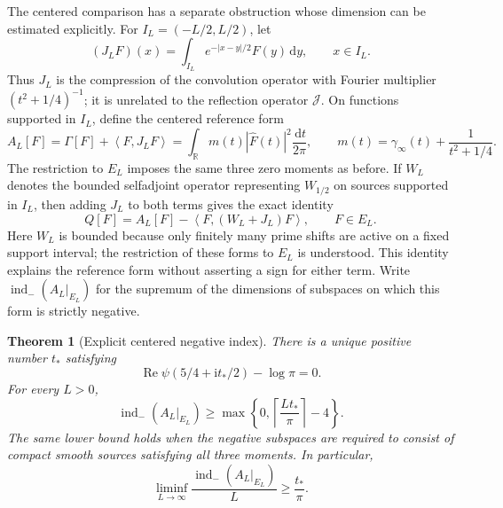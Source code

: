 \documentclass[11pt]{article}
\numberwithin{equation}{section}
\newtheorem{theorem}{Theorem}[section]
\theoremstyle{definition}
\theoremstyle{remark}
\newcommand{\Rea}{\operatorname{Re}}
\newcommand{\ii}{\mathrm i}
\newcommand{\J}{\mathcal J}
\newcommand{\inner}[2]{\left\langle #1,#2\right\rangle}
\newcommand{\dd}{\,\mathrm d}
\begin{document}
The centered comparison has a separate obstruction whose dimension can be
estimated explicitly.  For \(I_L=(-L/2,L/2)\), let
\[
 (J_LF)(x)=\int_{I_L}e^{-|x-y|/2}F(y)\dd y,
 \qquad x\in I_L.
\]
Thus \(J_L\) is the compression of the convolution operator with Fourier
multiplier \((t^2+1/4)^{-1}\); it is unrelated to the reflection operator
\(\J\).  On functions supported in \(I_L\), define the centered reference
form
\begin{equation}\label{eq:centered-reference-form}
 A_L[F]=\Gamma[F]+\inner{F}{J_LF}
       =\int_{\mathbb R}m(t)|\widehat F(t)|^2\frac{\dd t}{2\pi},
 \qquad m(t)=\gamma_\infty(t)+\frac{1}{t^2+1/4}.
\end{equation}
The restriction to \(E_L\) imposes the same three zero moments as before.
If \(W_L\) denotes the bounded selfadjoint operator representing
\(W_{1/2}\) on sources supported in \(I_L\), then adding \(J_L\) to
both terms gives the exact identity
\[
 Q[F]=A_L[F]-\inner{F}{(W_L+J_L)F},\qquad F\in E_L.
\]
Here \(W_L\) is bounded because only finitely many prime shifts are
active on a fixed support interval; the restriction of these forms to
\(E_L\) is understood.  This identity explains the reference form
without asserting a sign for either term.
Write \(\operatorname{ind}_{-}(A_L|_{E_L})\) for the supremum of the
dimensions of subspaces on which this form is strictly negative.

\begin{theorem}[Explicit centered negative index]
\label{thm:centered-negative-index}
There is a unique positive number \(t_*\) satisfying
\[
 \Rea\psi(5/4+\ii t_*/2)-\log\pi=0.
\]
For every \(L>0\),
\begin{equation}\label{eq:centered-negative-index-bound}
 \operatorname{ind}_{-}(A_L|_{E_L})
 \geq \max\left\{0,\left\lceil\frac{Lt_*}{\pi}\right\rceil-4\right\}.
\end{equation}
The same lower bound holds when the negative subspaces are required to
consist of compact smooth sources satisfying all three moments.  In
particular,
\begin{equation}\label{eq:centered-index-density}
 \liminf_{L\to\infty}\frac{\operatorname{ind}_{-}(A_L|_{E_L})}{L}
 \geq\frac{t_*}{\pi}.
\end{equation}
\end{theorem}
\end{document}
